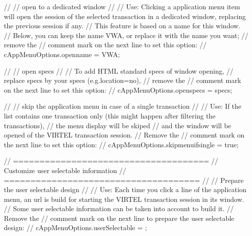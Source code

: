 \documentclass[letterpaper,10pt,english]{sphinxmanual}
\begin{document}
\begin{sphinxVerbatim}[commandchars=\\\{\}]
//
// open to a dedicated window
// \PYGZhy{}\PYGZhy{}\PYGZhy{}\PYGZhy{}\PYGZhy{}\PYGZhy{}\PYGZhy{}\PYGZhy{}\PYGZhy{}\PYGZhy{}\PYGZhy{}\PYGZhy{}\PYGZhy{}\PYGZhy{}\PYGZhy{}\PYGZhy{}\PYGZhy{}\PYGZhy{}\PYGZhy{}\PYGZhy{}\PYGZhy{}\PYGZhy{}\PYGZhy{}\PYGZhy{}\PYGZhy{}\PYGZhy{}
// Use: Clicking a application menu item will open the session of the selected transaction in a dedicated window, replacing the previous session if any.
// This feature is based on a name for this window.
// Below, you can keep the name \PYGZdq{}VWA\PYGZdq{}, or replace it with the name you want;
// remove the // comment mark on the next line to set this option:
// cAppMenuOptions.open\PYGZus{}name = \PYGZdq{}VWA\PYGZdq{};

//
// open specs
// \PYGZhy{}\PYGZhy{}\PYGZhy{}\PYGZhy{}\PYGZhy{}\PYGZhy{}\PYGZhy{}\PYGZhy{}\PYGZhy{}\PYGZhy{}
// To add HTML standard specs of window opening,
// replace specs by your specs (e.g.\PYGZdq{}location=no\PYGZdq{}),
// remove the // comment mark on the next line to set this option:
// cAppMenuOptions.open\PYGZus{}specs = specs;



//
// skip the application menu in case of a single transaction
// \PYGZhy{}\PYGZhy{}\PYGZhy{}\PYGZhy{}\PYGZhy{}\PYGZhy{}\PYGZhy{}\PYGZhy{}\PYGZhy{}\PYGZhy{}\PYGZhy{}\PYGZhy{}\PYGZhy{}\PYGZhy{}\PYGZhy{}\PYGZhy{}\PYGZhy{}\PYGZhy{}\PYGZhy{}\PYGZhy{}\PYGZhy{}\PYGZhy{}\PYGZhy{}\PYGZhy{}\PYGZhy{}\PYGZhy{}\PYGZhy{}\PYGZhy{}\PYGZhy{}\PYGZhy{}\PYGZhy{}\PYGZhy{}\PYGZhy{}\PYGZhy{}\PYGZhy{}\PYGZhy{}\PYGZhy{}\PYGZhy{}\PYGZhy{}\PYGZhy{}\PYGZhy{}\PYGZhy{}\PYGZhy{}\PYGZhy{}\PYGZhy{}\PYGZhy{}\PYGZhy{}\PYGZhy{}\PYGZhy{}\PYGZhy{}\PYGZhy{}\PYGZhy{}\PYGZhy{}\PYGZhy{}\PYGZhy{}\PYGZhy{}\PYGZhy{}\PYGZhy{}
// Use: If the list contains one transaction only (this might happen after filtering the transactions),
// the menu display will be skiped
// and the window will be opened of the VIRTEL transaction session.
// Remove the // comment mark on the next line to set this option:
// cAppMenuOptions.skip\PYGZus{}menu\PYGZus{}if\PYGZus{}single = true;






// =====================================
// Customize user selectable information
// =====================================
//
// Prepare the user selectable design
// \PYGZhy{}\PYGZhy{}\PYGZhy{}\PYGZhy{}\PYGZhy{}\PYGZhy{}\PYGZhy{}\PYGZhy{}\PYGZhy{}\PYGZhy{}\PYGZhy{}\PYGZhy{}\PYGZhy{}\PYGZhy{}\PYGZhy{}\PYGZhy{}\PYGZhy{}\PYGZhy{}\PYGZhy{}\PYGZhy{}\PYGZhy{}\PYGZhy{}\PYGZhy{}\PYGZhy{}\PYGZhy{}\PYGZhy{}\PYGZhy{}\PYGZhy{}\PYGZhy{}\PYGZhy{}\PYGZhy{}\PYGZhy{}\PYGZhy{}\PYGZhy{}
// Use: Each time you click a line of the application menu, an url is build for starting the VIRTEL transaction session in its window.
// Some user selectable information can be taken into account to build it.
// Remove the // comment mark on the next line to prepare the user selectable design:
// cAppMenuOptions.userSelectable = \PYGZob{}\PYGZcb{};


\end{sphinxVerbatim}
\end{document}

